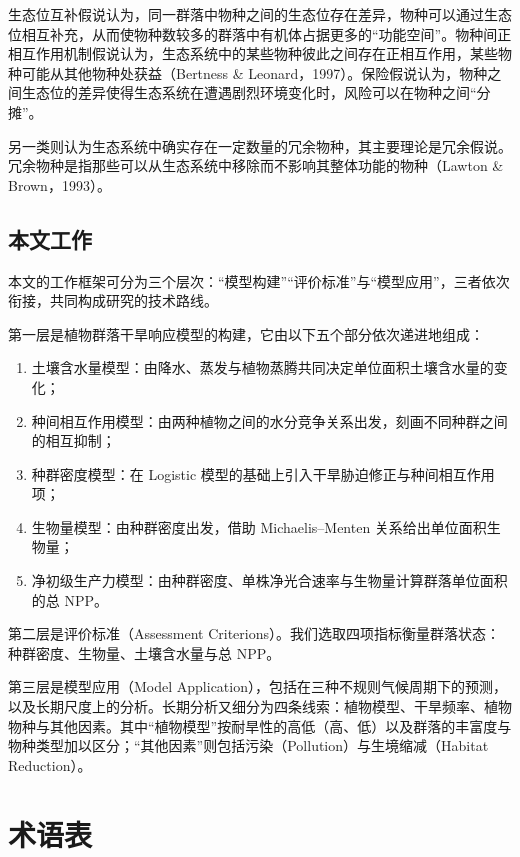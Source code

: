 \documentclass[11pt,a4paper]{ctexart}
\begin{document}
生态位互补假说认为，同一群落中物种之间的生态位存在差异，物种可以通过生态位相互补充，从而使物种数较多的群落中有机体占据更多的“功能空间”。物种间正相互作用机制假说认为，生态系统中的某些物种彼此之间存在正相互作用，某些物种可能从其他物种处获益（Bertness \& Leonard，1997）。保险假说认为，物种之间生态位的差异使得生态系统在遭遇剧烈环境变化时，风险可以在物种之间“分摊”。

另一类则认为生态系统中确实存在一定数量的冗余物种，其主要理论是冗余假说\cite{ref4}。冗余物种是指那些可以从生态系统中移除而不影响其整体功能的物种（Lawton \& Brown，1993）。

\subsection{本文工作}

本文的工作框架可分为三个层次：“模型构建”“评价标准”与“模型应用”，三者依次衔接，共同构成研究的技术路线。

第一层是植物群落干旱响应模型的构建，它由以下五个部分依次递进地组成：

\begin{enumerate}
\item 土壤含水量模型：由降水、蒸发与植物蒸腾共同决定单位面积土壤含水量的变化；
\item 种间相互作用模型：由两种植物之间的水分竞争关系出发，刻画不同种群之间的相互抑制；
\item 种群密度模型：在 Logistic 模型的基础上引入干旱胁迫修正与种间相互作用项；
\item 生物量模型：由种群密度出发，借助 Michaelis--Menten 关系给出单位面积生物量；
\item 净初级生产力模型：由种群密度、单株净光合速率与生物量计算群落单位面积的总 NPP。
\end{enumerate}

第二层是评价标准（Assessment Criterions）。我们选取四项指标衡量群落状态：种群密度、生物量、土壤含水量与总 NPP。

第三层是模型应用（Model Application），包括在三种不规则气候周期下的预测，以及长期尺度上的分析。长期分析又细分为四条线索：植物模型、干旱频率、植物物种与其他因素。其中“植物模型”按耐旱性的高低（高、低）以及群落的丰富度与物种类型加以区分；“其他因素”则包括污染（Pollution）与生境缩减（Habitat Reduction）。

\section{术语表}
\end{document}
